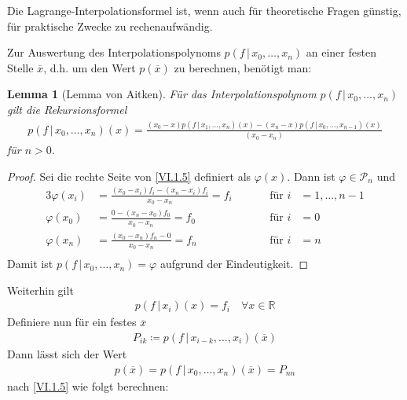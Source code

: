 \documentclass[ngerman,fontsize=11pt, paper=a4, parskip=half, titlepage=true, toc=bib]{scrbook}
\theoremstyle{definition}
\theoremstyle{plain}
\newtheorem{Lem}[Def]{Lemma}		%
\newcommand{\R}{\mathds{R}}
\newcommand{\subsectione}[1]{\addtocounter{Def}{1}\subsection{#1}}
\newenvironment{Leme}[1][]{ %
  \begin{Lem}[#1]
  }
  {
  \end{Lem}
  \addtocounter{subsection}{1}
}
\begin{document}
Die Lagrange-Interpolationsformel ist,
wenn auch für theoretische Fragen günstig,
für praktische Zwecke zu rechenaufwändig.

Zur Auswertung des Interpolationspolynoms $p(f\,|\,x_0,\dots, x_n)$
an einer festen Stelle $\overline{x}$, d.h.
um den Wert $p(\overline{x} ) $ zu berechnen,
benötigt man:

\begin{Leme}[Lemma von Aitken]
  Für das Interpolationspolynom $p(f\,|\,x_0, \dots, x_n)$ gilt die 
  Rekursionsformel
  \begin{gather}
    p(f\,|\,x_0, \dots, x_n) (x) = \frac{(x_0-x)p(f\,|\,x_1,\dots, x_n)(x) -
      (x_n-x)p(f\,|\,x_0,\dots, x_{n-1})(x)}
    {(x_0-x_n)}
    \label{VI.1.5}
  \end{gather}
  für $n>0$.	
\end{Leme}

\begin{proof}
  Sei die rechte Seite von \eqref{VI.1.5} definiert als $\varphi(x)$.
  Dann ist $\varphi\in\mathcal{P}_n$ und 
  \begin{alignat*}{3}
    \varphi(x_i) &= \frac{(x_0-x_i)f_i-(x_n-x_i)f_i}{x_0-x_n}= f_i\quad
    &&&\text{für } i&=1,\dots , n-1\\
    \varphi(x_0) &= \frac{0-(x_n-x_0)f_0}{x_0-x_n} = f_0
    &&&\text{für } i&=0\\
    \varphi(x_n) &= \frac{(x_0-x_n)f_n-0}{x_0-x_n} = f_n
    &&&\text{für } i&=n\\
  \end{alignat*}
  Damit ist $p(f\,|\,x_0, \dots, x_n) = \varphi$ aufgrund der Eindeutigkeit.
\end{proof}



Weiterhin gilt
\begin{gather}
  p(f\,|\, x_i)(x) = f_i\quad \forall x\in\R
  \label{VI.1.6}
\end{gather}
Definiere nun für ein festes $\overline{x}$
\begin{gather}
  P_{ik} \coloneqq p(f\,|\, x_{i-k}, \dots, x_{i})(\overline{x})
  \label{VI.1.7}
\end{gather}
Dann lässt sich der Wert
\begin{gather*}
  p(\overline{x}) = p(f\,|\, x_0, \dots , x_n)(\overline{x})= P_{nn}
\end{gather*}
nach \eqref{VI.1.5} wie folgt berechnen:
\end{document}
